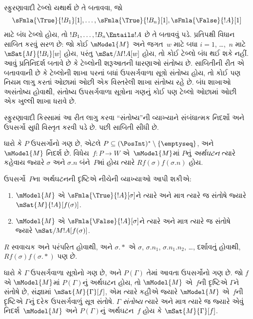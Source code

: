 \begin{explain}
  સ્ફુરણાવાદી ટેબ્લો યથાર્થ છે તે બતાવવા,
  જો
  \[
  \sFmla{\True}{!B_1}[1], \dots, \sFmla{\True}{!B_n}[1], \sFmla{\False}{!A}[1]
  \]
  માટે બંધ ટેબ્લો હોય, તો
  $!B_1, \dots, !B_n \Entails !A$ છે તે બતાવવું પડે.
  પ્રતિપક્ષી વિધાન સાબિત કરવું સરળ છે: જો કોઈ
  $\mModel{M}$ અને જગત~$w$ માટે બધા $i=1$,
  \dots,~$n$ માટે $\mSat{M}{!B_i}[w]$ હોય,
  પરંતુ $\mSat/{M}{!A}[w]$ હોય, તો કોઈ
  ટેબ્લો બંધ થઈ શકે નહીં.
  આવું પ્રતિનિદર્શ બતાવે છે કે ટેબ્લોની
  શરૂઆતની ધારણાઓ સંતોષ્ય છે. સાબિતીની રીત એ
  બતાવવાની છે કે ટેબ્લોની શાખા પરનાં બધાં
  ઉપસર્ગવાળા સૂત્રો સંતોષ્ય હોય, તો કોઈ પણ
  નિયમ લાગુ કરતાં ઓછામાં ઓછી એક વિસ્તરેલી શાખા
  સંતોષ્ય રહે છે. બંધ શાખાઓ અસંતોષ્ય હોવાથી,
  સંતોષ્ય ઉપસર્ગવાળા સૂત્રોના ગણનું કોઈ પણ
  ટેબ્લો ઓછામાં ઓછી એક ખુલ્લી શાખા ધરાવે છે.

  સ્ફુરણાવાદી કિસ્સામાં આ રીત લાગુ કરવા
  ``સંતોષ્ય''ની વ્યાખ્યાને સંબંધાત્મક નિદર્શો અને
  ઉપસર્ગો સુધી વિસ્તૃત કરવી પડે છે. પછી સાબિતી
  સીધી છે.
\end{explain}

\begin{defn}
  ધારો કે $P$ ઉપસર્ગોનો ગણ છે, એટલે
  $P \subseteq (\PosInt)^* \setminus \{\emptyseq\}$,
  અને $\mModel{M}$ નિદર્શ છે.
  વિધેય~$f\colon P \to W$ એ~$\mModel{M}$માં
  $P$નું \emph{અર્થઘટન} ત્યારે કહેવાય જ્યારે
  $\sigma$ અને $\sigma.n$ બંને~$P$માં હોય ત્યારે
  $Rf(\sigma)f(\sigma.n)$ હોય.

  ઉપસર્ગો~$P$ના અર્થઘટનની દૃષ્ટિએ નીચેની
  વ્યાખ્યાઓ આપી શકીએ:
  \begin{enumerate}
  \item $\mModel{M}$ એ $\sFmla{\True}{!A}[\sigma]$ને
    ત્યારે અને માત્ર ત્યારે જ સંતોષે જ્યારે
    $\mSat{M}{!A}[f(\sigma)]$.
  \item $\mModel{M}$ એ $\sFmla{\False}{!A}[\sigma]$ને
    ત્યારે અને માત્ર ત્યારે જ સંતોષે જ્યારે
    $\mSat/{M}{!A}[f(\sigma)]$.
  \end{enumerate}
\end{defn}

$R$ સ્વવાચક અને પરંપરિત હોવાથી, અને $\sigma.{*}$
એ $\sigma$, $\sigma.n_1$, $\sigma.n_1.n_2$,
\dots, દર્શાવતું હોવાથી, $Rf(\sigma)f(\sigma.{*})$
પણ છે.

\begin{defn}
  ધારો કે $\Gamma$ ઉપસર્ગવાળા સૂત્રોનો ગણ છે,
  અને $P(\Gamma)$ તેમાં આવતા ઉપસર્ગોનો ગણ છે.
  જો $f$ એ $\mModel{M}$માં $P(\Gamma)$નું અર્થઘટન
  હોય, તો $\mModel{M}$ એ~$f$ની દૃષ્ટિએ $\Gamma$ને
  સંતોષે છે, સંજ્ઞામાં $\mSat{M}{\Gamma}[f]$,
  એમ ત્યારે કહીએ જ્યારે $\mModel{M}$ એ~$f$ની
  દૃષ્ટિએ $\Gamma$નું દરેક ઉપસર્ગવાળું સૂત્ર
  સંતોષે. $\Gamma$ \emph{સંતોષ્ય} ત્યારે અને માત્ર
  ત્યારે જ જ્યારે એવું નિદર્શ~$\mModel{M}$ અને
  $P(\Gamma)$નું અર્થઘટન~$f$ હોય કે
  $\mSat{M}{\Gamma}[f]$.
\end{defn}

